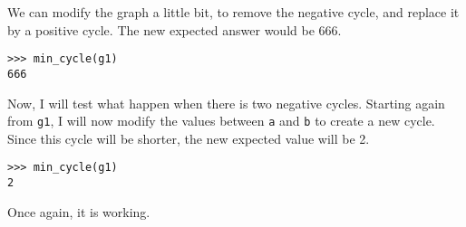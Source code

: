         We can modify the graph a little bit, to remove the negative cycle, and replace it by a positive cycle. The new expected answer would be $666$.
        \begin{lstlisting}
>>> min_cycle(g1)
666
        \end{lstlisting}

        Now, I will test what happen when there is two negative cycles. Starting again from \verb|g1|, I will now modify the values between \verb|a| and \verb|b| to create a new cycle. Since this cycle will be shorter, the new expected value will be 2.
        \begin{lstlisting}
>>> min_cycle(g1)
2
        \end{lstlisting}

        Once again, it is working.